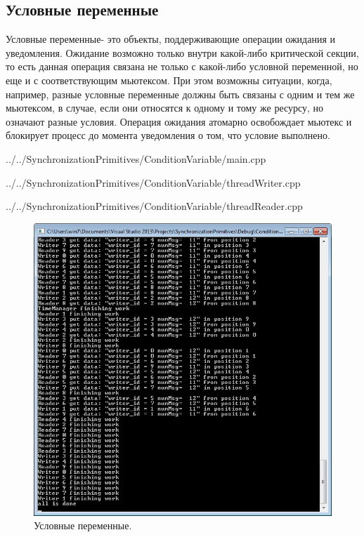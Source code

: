 \documentclass[a4paper, 12pt]{article}		%
\begin{document}
\newpage
\subsection{Условные переменные}

Условные переменные- это объекты, поддерживающие операции ожидания и уведомления. Ожидание возможно только внутри какой-либо критической секции, то есть данная операция связана не только с какой-либо условной переменной, но еще и с соответствующим мьютексом. При этом возможны ситуации, когда, например, разные условные переменные должны быть связаны с одним и тем же мьютексом, в случае, если они относятся к одному и тому же ресурсу, но означают разные условия. Операция ожидания атомарно освобождает мьютекс и блокирует процесс до момента уведомления о том, что условие выполнено.


{../../SynchronizationPrimitives/ConditionVariable/main.cpp}


{../../SynchronizationPrimitives/ConditionVariable/threadWriter.cpp}


{../../SynchronizationPrimitives/ConditionVariable/threadReader.cpp}

\begin{figure}[h!]
\centering
\includegraphics[scale=1]{res/005}
\caption{Условные переменные.}
\end{figure}
\end{document}
